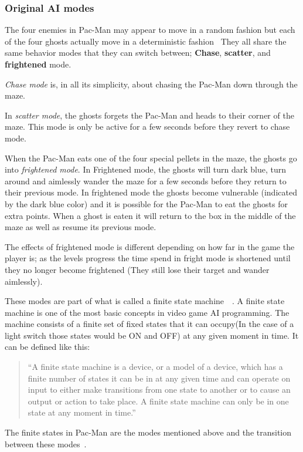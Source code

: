 
\subsubsection{Original AI modes}
The four enemies in Pac-Man may appear to move in a random fashion but each of the four ghosts actually move in a deterministic fashion~\autocite{Pittman2011} They all share the same behavior modes that they can switch between; \textbf{Chase}, \textbf{scatter}, and \textbf{frightened} mode.

\emph{Chase mode} is, in all its simplicity, about chasing the Pac-Man down through the maze.

In \emph{scatter mode}, the ghosts forgets the Pac-Man and heads to their corner of the maze. This mode is only be active for a few seconds before they revert to chase mode.

When the Pac-Man eats one of the four special pellets in the maze, the ghosts go into \emph{frightened mode}. In Frightened mode, the ghosts will turn dark blue, turn around and aimlessly wander the maze for a few seconds before they return to their previous mode. In frightened mode the ghosts become vulnerable (indicated by the dark blue color) and it is possible for the Pac-Man to eat the ghosts for extra points. When a ghost is eaten it will return to the box in the middle of the maze as well as resume its previous mode.

The effects of frightened mode is different depending on how far in the game the player is; as the levels progress the time spend in fright mode is shortened until they no longer become frightened (They still lose their target and wander aimlessly).

These modes are part of what is called a finite state machine~\autocite[pp.44]{Buckland2005}~\autocite{Kehoe2009}.
A finite state machine is one of the most basic concepts in video game AI programming. The machine consists of a finite set of fixed states that it can occupy(In the case of a light switch those states would be ON and OFF) at any given moment in time. It can be defined like this:

\blockquote[\autocite{Buckland2005}]{\enquote{A finite state machine is a device, or a model of a device, which has a finite number of states it can be in at any given time and can operate on input to either make transitions from one state to another or to cause an output or action to take place. A finite state machine can only be in one state at any moment in time.}}

The finite states in Pac-Man are the modes mentioned above and the transition between these modes~\autocite[pp.45]{Buckland2005}.